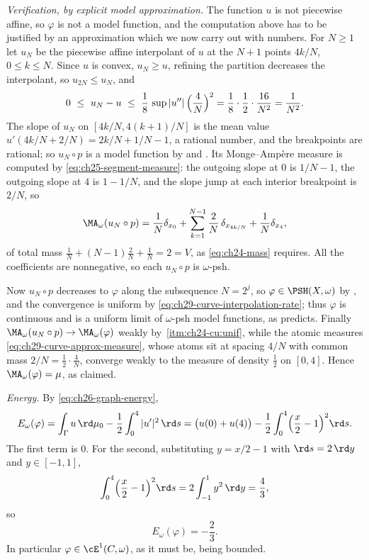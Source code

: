 \begin{example}
\emph{Verification, by explicit model approximation.}  The function $u$ is
not piecewise affine, so $\varphi$ is not a model function, and the
computation above has to be justified by an approximation which we now carry
out with numbers.  For $N\geq1$ let $u_N$ be the piecewise affine
interpolant of $u$ at the $N+1$ points $4k/N$, $0\leq k\leq N$.
Since $u$ is convex, $u_N\geq u$, refining the partition decreases the
interpolant, so $u_{2N}\leq u_N$, and
\begin{equation}
\label{eq:ch29-curve-interpolation-rate}
 0\ \leq\ u_N-u\ \leq\ \frac18\,\sup|u''|\,\Bigl(\frac4N\Bigr)^2
 =\frac18\cdot\frac12\cdot\frac{16}{N^2}=\frac1{N^2}.
\end{equation}
The slope of $u_N$ on $[4k/N,4(k+1)/N]$ is the mean value
$u'(4k/N+2/N)=2k/N+1/N-1$, a rational number, and the breakpoints are
rational; so $u_N\circ p$ is a model function by
 and
.  Its Monge--Amp\`ere measure is computed by
\eqref{eq:ch25-segment-measure}: the outgoing slope at $0$ is
$1/N-1$, the outgoing slope at $4$ is $1-1/N$, and the slope jump at
each interior breakpoint is $2/N$, so
\begin{equation}
\label{eq:ch29-curve-approx-measure}
 \MA_\omega(u_N\circ p)
 =\frac1N\delta_{x_0}
  +\sum_{k=1}^{N-1}\frac2N\,\delta_{x_{4k/N}}
  +\frac1N\delta_{x_4},
\end{equation}
of total mass $\tfrac1N+(N-1)\tfrac2N+\tfrac1N=2=V$, as
\eqref{eq:ch24-mass} requires.  All the coefficients are nonnegative, so
each $u_N\circ p$ is $\omega$-psh.

Now $u_N\circ p$ decreases to $\varphi$ along the subsequence
$N=2^j$, so $\varphi\in\PSH(X,\omega)$ by
, and the convergence is uniform by
\eqref{eq:ch29-curve-interpolation-rate}; thus $\varphi$ is continuous and
is a uniform limit of $\omega$-psh model functions, as
 predicts.  Finally
$\MA_\omega(u_N\circ p)\to\MA_\omega(\varphi)$ weakly by
\,\cref{itm:ch24-cu:unif}, while the
atomic measures \eqref{eq:ch29-curve-approx-measure}, whose atoms sit at
spacing $4/N$ with common mass $2/N=\tfrac12\cdot\tfrac4N$, converge
weakly to the measure of density $\tfrac12$ on $[0,4]$.  Hence
$\MA_\omega(\varphi)=\mu$, as claimed.

\emph{Energy.}  By \eqref{eq:ch26-graph-energy},
\[
 E_\omega(\varphi)
 =\int_\Gamma u\,\rd\mu_0-\frac12\int_0^4|u'|^2\,\rd s
 =\bigl(u(0)+u(4)\bigr)
  -\frac12\int_0^4\Bigl(\frac x2-1\Bigr)^2\rd s .
\]
The first term is $0$.  For the second, substituting $y=x/2-1$ with
$\rd s=2\,\rd y$ and $y\in[-1,1]$,
\[
 \int_0^4\Bigl(\frac x2-1\Bigr)^2\rd s=2\int_{-1}^1y^2\,\rd y=\frac43 ,
\]
so
\begin{equation}
\label{eq:ch29-curve-energy}
 E_\omega(\varphi)=-\frac23 .
\end{equation}
In particular $\varphi\in\cE^1(C,\omega)$, as it must be, being bounded.


\end{example}
